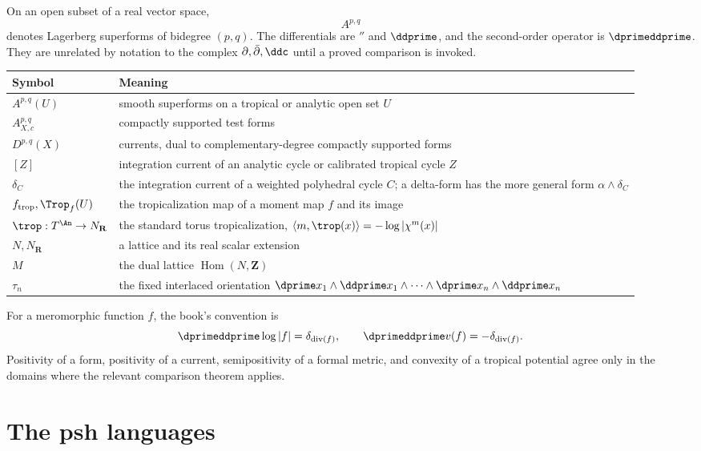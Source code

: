 On an open subset of a real vector space,
\[
 A^{p,q}
\]
denotes Lagerberg superforms of bidegree \((p,q)\).  The differentials are
\(\dprime\) and \(\ddprime\), and the second-order operator is
\(\dprimeddprime\).  They are unrelated by notation to the complex
\(\partial,\bar\partial,\ddc\) until a proved comparison is invoked.

\begin{center}
\begin{tabular}{@{}p{}p{}@{}}
\toprule
Symbol & Meaning \\
\midrule
\(A^{p,q}(U)\)
  & smooth superforms on a tropical or analytic open set \(U\) \\
\(A_{X,c}^{p,q}\)
  & compactly supported test forms \\
\(D^{p,q}(X)\)
  & currents, dual to complementary-degree compactly supported forms \\
\([Z]\)
  & integration current of an analytic cycle or calibrated tropical cycle
    \(Z\) \\
\(\delta_C\)
  & the integration current of a weighted polyhedral cycle \(C\); a
    delta-form has the more general form \(\alpha\wedge\delta_C\) \\
\(f_{\mathrm{trop}},\Trop_f(U)\)
  & the tropicalization map of a moment map \(f\) and its image \\
\(\trop:T^{\An}\to N_{\mathbf R}\)
  & the standard torus tropicalization,
    \(\langle m,\trop(x)\rangle=-\log|\chi^m(x)|\) \\
\(N,N_{\mathbf R}\)
  & a lattice and its real scalar extension \\
\(M\)
  & the dual lattice \(\operatorname{Hom}(N,\mathbf Z)\) \\
\(\tau_n\)
  & the fixed interlaced orientation
    \(\dprime x_1\wedge\ddprime x_1\wedge\cdots
      \wedge\dprime x_n\wedge\ddprime x_n\) \\
\bottomrule
\end{tabular}
\end{center}

For a meromorphic function \(f\), the book's convention is
\[
 \dprimeddprime\log|f|=\delta_{\operatorname{div}(f)},
 \qquad
 \dprimeddprime v(f)=-\delta_{\operatorname{div}(f)}.
\]
Positivity of a form, positivity of a current, semipositivity of a formal
metric, and convexity of a tropical potential agree only in the domains
where the relevant comparison theorem applies.

\section{The psh languages}
\label{sec:appK-psh}

